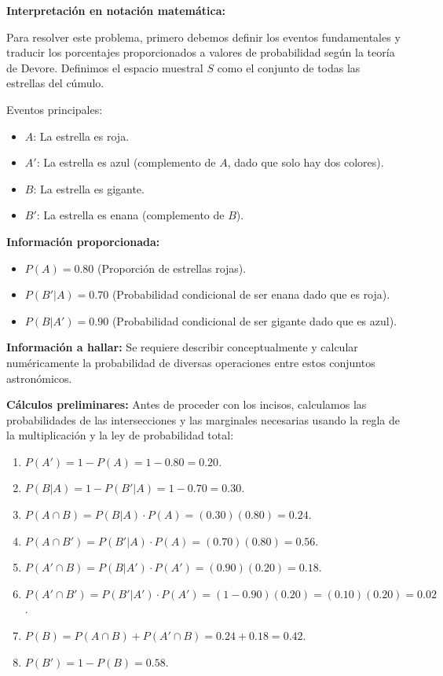 \documentclass[a4paper]{article}
\begin{document}
\textbf{Interpretación en notación matemática:}

Para resolver este problema, primero debemos definir los eventos fundamentales y traducir los porcentajes proporcionados a valores de probabilidad según la teoría de Devore. Definimos el espacio muestral $S$ como el conjunto de todas las estrellas del cúmulo.

Eventos principales:
\begin{itemize}
    \item $A$: La estrella es roja.
    \item $A'$: La estrella es azul (complemento de $A$, dado que solo hay dos colores).
    \item $B$: La estrella es gigante.
    \item $B'$: La estrella es enana (complemento de $B$).
\end{itemize}

\textbf{Información proporcionada:}
\begin{itemize}
    \item $P(A) = 0.80$ (Proporción de estrellas rojas).
    \item $P(B' | A) = 0.70$ (Probabilidad condicional de ser enana dado que es roja).
    \item $P(B | A') = 0.90$ (Probabilidad condicional de ser gigante dado que es azul).
\end{itemize}

\textbf{Información a hallar:}
Se requiere describir conceptualmente y calcular numéricamente la probabilidad de diversas operaciones entre estos conjuntos astronómicos.

\textbf{Cálculos preliminares:}
Antes de proceder con los incisos, calculamos las probabilidades de las intersecciones y las marginales necesarias usando la regla de la multiplicación y la ley de probabilidad total:
\begin{enumerate}
    \item $P(A') = 1 - P(A) = 1 - 0.80 = 0.20$.
    \item $P(B | A) = 1 - P(B' | A) = 1 - 0.70 = 0.30$.
    \item $P(A \cap B) = P(B | A) \cdot P(A) = (0.30)(0.80) = 0.24$.
    \item $P(A \cap B') = P(B' | A) \cdot P(A) = (0.70)(0.80) = 0.56$.
    \item $P(A' \cap B) = P(B | A') \cdot P(A') = (0.90)(0.20) = 0.18$.
    \item $P(A' \cap B') = P(B' | A') \cdot P(A') = (1 - 0.90)(0.20) = (0.10)(0.20) = 0.02$.
    \item $P(B) = P(A \cap B) + P(A' \cap B) = 0.24 + 0.18 = 0.42$.
    \item $P(B') = 1 - P(B) = 0.58$.
\end{enumerate}
\end{document}
